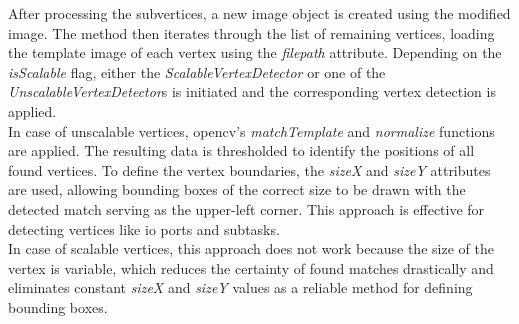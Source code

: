 After processing the subvertices, a new image object is created using the modified image. The method then iterates through the list of remaining vertices, loading the template image of each vertex using the \textit{filepath} attribute. Depending on the \textit{isScalable} flag, either the \textit{ScalableVertexDetector} or one of the \textit{UnscalableVertexDetector}s is initiated and the corresponding vertex detection is applied.\\
In case of unscalable vertices, \acrshort{opencv}'s \textit{matchTemplate} and \textit{normalize} functions are applied. The resulting data is thresholded to identify the positions of all found vertices. To define the vertex boundaries, the \textit{sizeX} and \textit{sizeY} attributes are used, allowing bounding boxes of the correct size to be drawn with the detected match serving as the upper-left corner. This approach is effective for detecting vertices like \acrshort{io} ports and subtasks.\\
In case of scalable vertices, this approach does not work because the size of the vertex is variable, which reduces the certainty of found matches drastically and eliminates constant \textit{sizeX} and \textit{sizeY} values as a reliable method for defining bounding boxes.\\

